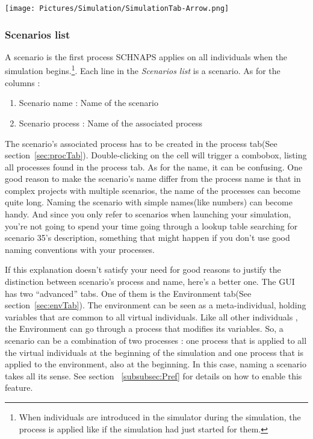 \documentclass[a4paper,11pt]{report}
\begin{document}
\begin{center}
\texttt{[image: Pictures/Simulation/SimulationTab-Arrow.png]}
\label{fig:simTab}
\end{center}

\subsubsection{Scenarios list}
\label{subsubsec:scenList}
A scenario is the first process SCHNAPS applies on all individuals when the simulation begins.\footnote{When individuals are introduced in the simulator during the simulation, the process is applied like if the simulation had just started for them.}. Each line in the \emph{Scenarios list} is a scenario. As for the columns :
\begin{enumerate}
\item{Scenario name : } Name of the scenario
\item{Scenario process : } Name of the associated process
\end{enumerate}
The scenario's associated process has to be created in the process tab(See section~\ref{sec:procTab}). Double-clicking on the cell will trigger a combobox, listing all processes found in the process tab. As for the name, it can be confusing. One good reason to make the scenario's name differ from the process name is that in complex projects with multiple scenarios, the name of the processes can become quite long. Naming the scenario with simple names(like numbers) can become handy. And since you only refer to scenarios when launching your simulation, you're not going to spend your time going through a lookup table searching for scenario 35's description, something that might happen if you don't use good naming conventions with your processes.

If this explanation doesn't satisfy your need for good reasons to justify the distinction between scenario's process and name, here's a better one. The GUI has two ``advanced'' tabs. One of them is the Environment tab(See section~\ref{sec:envTab}). The environment can be seen as a meta-individual, holding variables that are common to all virtual individuals. Like all other individuals , the Environment can go through a process that modifies its variables. So, a scenario can be a combination of two processes : one process that is applied to all the virtual individuals at the beginning of the simulation and one process that is applied to the environment, also at the beginning. In this case, naming a scenario takes all its sense. See section ~\ref{subsubsec:Pref} for details on how to enable this feature.
\end{document}
